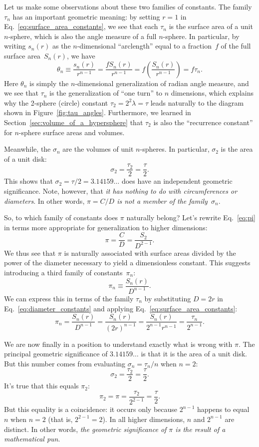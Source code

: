 {Let us make some observations about these two families of constants. The family $\tau_n$ has an important geometric meaning: by setting $r=1$ in Eq.~\eqref{eq:surface_area_constants}, we see that each $\tau_n$ is the surface area of a unit $n$-sphere, which is also the angle measure of a full $n$-sphere. In particular, by writing $s_n(r)$ as the $n$-dimensional ``arclength'' equal to a fraction~$f$ of the full surface area~$S_n(r)$, we have
\[
\theta_n \equiv \frac{s_n(r)}{r^{n-1}} = \frac{f S_n(r)}{r^{n-1}} = f\left(\frac{S_n(r)}{r^{n-1}}\right) = f\tau_n.
\]
Here $\theta_n$ is simply the $n$-dimensional generalization of radian angle measure, and we see that $\tau_n$ is the generalization of ``one turn'' to $n$ dimensions, which explains why the 2-sphere (circle) constant $\tau_2 = 2^2\lambda = \tau$ leads naturally to the diagram shown in Figure~\ref{fig:tau_angles}. Furthermore, we learned in Section~\ref{sec:volume_of_a_hypersphere} that $\tau_2$ is also the ``recurrence constant'' for $n$-sphere surface areas and volumes.

Meanwhile, the $\sigma_n$ are the volumes of unit $n$-spheres. In particular, $\sigma_2$ is the area of a unit disk:
\[
\sigma_2 = \frac{\tau_2}{2} = \frac{\tau}{2}.
\]
This shows that $\sigma_2 = \tau/2 = 3.14159\ldots$ does have an independent geometric significance. Note, however, that \emph{it has nothing to do with circumferences or diameters}. In other words, \emph{$\pi = C/D$ is not a member of the family~$\sigma_n$}.

So, to which family of constants does $\pi$ naturally belong?
Let's rewrite Eq.~\eqref{eq:pi} in terms more appropriate for generalization to higher dimensions:
\[
\pi = \frac{C}{D} = \frac{S_2}{D^{2-1}}.
\]
We thus see that $\pi$ is naturally associated with surface areas divided by the power of the diameter necessary to yield a dimensionless constant. This suggests introducing a third family of constants~$\pi_n$:
\begin{equation}
\label{eq:diameter_constants}
\pi_n \equiv \frac{S_n(r)}{D^{n-1}}.
\end{equation}
We can express this in terms of the family $\tau_n$ by substituting $D = 2r$ in Eq.~\eqref{eq:diameter_constants} and applying Eq.~\eqref{eq:surface_area_constants}:
\[
\pi_n = \frac{S_n(r)}{D^{n-1}} = \frac{S_n(r)}{(2r)^{n-1}} =
\frac{S_n(r)}{2^{n-1}r^{n-1}} = \frac{\tau_n}{2^{n-1}}.
\]

We are now finally in a position to understand exactly what is wrong with $\pi$. The principal geometric significance of $3.14159\ldots$ is that it is the area of a unit disk. But this number comes from evaluating $\sigma_n = \tau_n/n$ when $n=2$:
\[
\sigma_2 = \frac{\tau_2}{2} = \frac{\tau}{2}.
\]
It's true that this equals $\pi_2$:
\[
\pi_2 = \pi = \frac{\tau_2}{2^{2-1}} = \frac{\tau}{2}.
\]
But this equality is a coincidence: it occurs only because $2^{n-1}$ happens to equal $n$ when $n=2$ (that is, $2^{2-1} = 2$). In all higher dimensions, $n$ and $2^{n-1}$ are distinct. In other words, \emph{the geometric significance of $\pi$ is the result of a mathematical pun}.

}
